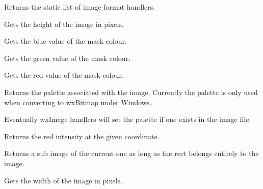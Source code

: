 Returns the static list of image format handlers.



\label{wximagegetheight}


Gets the height of the image in pixels.

\label{wximagegetmaskblue}


Gets the blue value of the mask colour.

\label{wximagegetmaskgreen}


Gets the green value of the mask colour.

\label{wximagegetmaskred}


Gets the red value of the mask colour.

\label{wximagegetpalette}


Returns the palette associated with the image. Currently the palette is only
used when converting to wxBitmap under Windows.

Eventually wxImage handlers will set the palette if one exists in the image file.

\label{wximagegetred}


Returns the red intensity at the given coordinate.

\label{wximagegetsubimage}


Returns a sub image of the current one as long as the rect belongs entirely to 
the image.

\label{wximagegetwidth}


Gets the width of the image in pixels.

